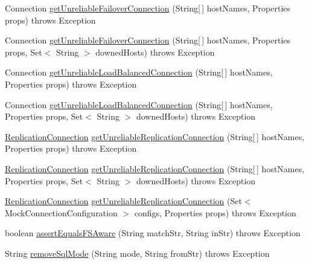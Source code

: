 \begin{DoxyCompactItemize}
\item 
Connection \mbox{\hyperlink{classtestsuite_1_1_base_test_case_af564d6c77d426f7c2fbd614c4e8843f5}{get\+Unreliable\+Failover\+Connection}} (String\mbox{[}$\,$\mbox{]} host\+Names, Properties props)  throws Exception 
\item 
Connection \mbox{\hyperlink{classtestsuite_1_1_base_test_case_ae47036b912887e1198a33eeaf0dff29c}{get\+Unreliable\+Failover\+Connection}} (String\mbox{[}$\,$\mbox{]} host\+Names, Properties props, Set$<$ String $>$ downed\+Hosts)  throws Exception 
\item 
Connection \mbox{\hyperlink{classtestsuite_1_1_base_test_case_a81c482cdb87cc311d0ed83ff480594bf}{get\+Unreliable\+Load\+Balanced\+Connection}} (String\mbox{[}$\,$\mbox{]} host\+Names, Properties props)  throws Exception 
\item 
Connection \mbox{\hyperlink{classtestsuite_1_1_base_test_case_af1e7c3a34a87ab4a008843290942cdaa}{get\+Unreliable\+Load\+Balanced\+Connection}} (String\mbox{[}$\,$\mbox{]} host\+Names, Properties props, Set$<$ String $>$ downed\+Hosts)  throws Exception 
\item 
\mbox{\hyperlink{interfacecom_1_1mysql_1_1cj_1_1jdbc_1_1ha_1_1_replication_connection}{Replication\+Connection}} \mbox{\hyperlink{classtestsuite_1_1_base_test_case_ad87384bfe06e3ddfbf89578316b176a2}{get\+Unreliable\+Replication\+Connection}} (String\mbox{[}$\,$\mbox{]} host\+Names, Properties props)  throws Exception 
\item 
\mbox{\hyperlink{interfacecom_1_1mysql_1_1cj_1_1jdbc_1_1ha_1_1_replication_connection}{Replication\+Connection}} \mbox{\hyperlink{classtestsuite_1_1_base_test_case_add2c34fed4dd457540016f9d22a6fcb2}{get\+Unreliable\+Replication\+Connection}} (String\mbox{[}$\,$\mbox{]} host\+Names, Properties props, Set$<$ String $>$ downed\+Hosts)  throws Exception 
\item 
\mbox{\hyperlink{interfacecom_1_1mysql_1_1cj_1_1jdbc_1_1ha_1_1_replication_connection}{Replication\+Connection}} \mbox{\hyperlink{classtestsuite_1_1_base_test_case_a343014aac2808c32fbadb0f42a22f77d}{get\+Unreliable\+Replication\+Connection}} (Set$<$ Mock\+Connection\+Configuration $>$ configs, Properties props)  throws Exception 
\item 
boolean \mbox{\hyperlink{classtestsuite_1_1_base_test_case_a5c1fa014de36c1991223cb4b32cab1fc}{assert\+Equals\+F\+S\+Aware}} (String match\+Str, String in\+Str)  throws Exception 
\item 
String \mbox{\hyperlink{classtestsuite_1_1_base_test_case_a9df2dad075d7a0d282a1c46a9be4bf66}{remove\+Sql\+Mode}} (String mode, String from\+Str)  throws Exception 
\end{DoxyCompactItemize}

